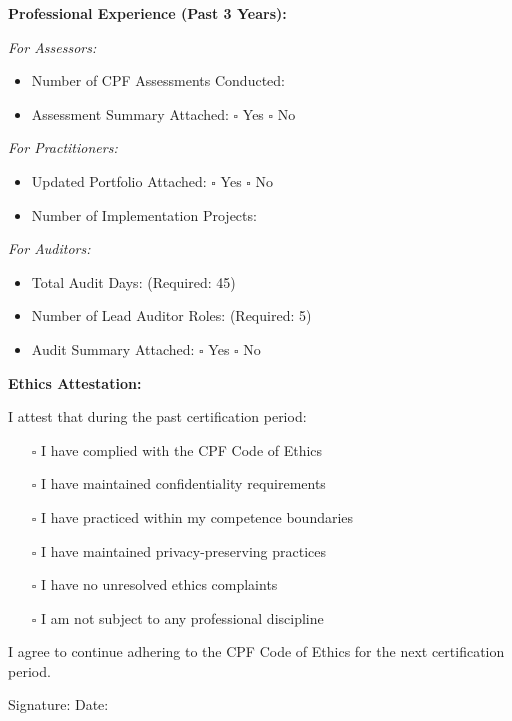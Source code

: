 \documentclass[11pt,a4paper]{article}
\begin{document}
\textbf{Professional Experience (Past 3 Years):}

\textit{For Assessors:}
\begin{itemize}
\item Number of CPF Assessments Conducted: \underline{\hspace{3cm}}
\item Assessment Summary Attached: $\square$ Yes $\square$ No
\end{itemize}

\textit{For Practitioners:}
\begin{itemize}
\item Updated Portfolio Attached: $\square$ Yes $\square$ No
\item Number of Implementation Projects: \underline{\hspace{3cm}}
\end{itemize}

\textit{For Auditors:}
\begin{itemize}
\item Total Audit Days: \underline{\hspace{3cm}} (Required: 45)
\item Number of Lead Auditor Roles: \underline{\hspace{3cm}} (Required: 5)
\item Audit Summary Attached: $\square$ Yes $\square$ No
\end{itemize}

\textbf{Ethics Attestation:}

I attest that during the past certification period:
\begin{itemize}
\item[$\square$] I have complied with the CPF Code of Ethics
\item[$\square$] I have maintained confidentiality requirements
\item[$\square$] I have practiced within my competence boundaries
\item[$\square$] I have maintained privacy-preserving practices
\item[$\square$] I have no unresolved ethics complaints
\item[$\square$] I am not subject to any professional discipline
\end{itemize}

I agree to continue adhering to the CPF Code of Ethics for the next certification period.

Signature: \underline{\hspace{8cm}} Date: \underline{\hspace{4cm}}
\end{document}
